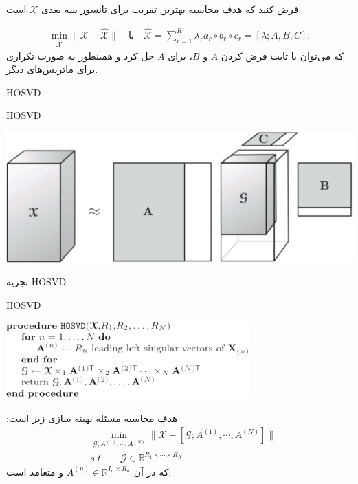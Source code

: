 \begin{frame}
\small{
فرض کنید که هدف محاسبه بهترین تقریب برای تانسور سه بعدی 
$\mathcal{X}$
است. 

\begin{align*}
\min\limits_{\hat{\mathcal{X}}}\|\mathcal{X}-\hat{\mathcal{X}}\|
\quad \text{با}\quad
\hat{\mathcal{X}}=\sum_{r=1}^R \lambda_r a_r\circ b_r\circ c_r=[\lambda;A,B,C].
\end{align*}
که می‌توان با ثابت فرض کردن $A$ و $B$، 
برای $A$ حل کرد و همینطور به صورت تکراری برای ماتریس‌های دیگر.
}
\end{frame}
\begin{frame}[standout]
HOSVD
\end{frame}
\begin{frame}{HOSVD}
\begin{center}
	\includegraphics[width=1\textwidth]{img/ok/HOSVD.pdf}
\end{center}
\begin{center}
	تجزیه
	HOSVD
\end{center}
\end{frame}
\begin{frame}{HOSVD}
\begin{center}
	\includegraphics[width=0.7\textwidth]{img/ok/alHOSVD.pdf}
\end{center}
\pause
\small{
هدف محاسبه مسئله بهینه سازی زیر است:
\begin{align*}
&\min\limits_{\mathcal{G},A^{(1)},\cdots,A^{(N)}} \|\mathcal{X}-[\mathcal{G};A^{(1)},\cdots,A^{(N)}]\|\\
&s.t \qquad \mathcal{G}\in\mathbb{R}^{R_1\times \cdots\times R_N}
\end{align*}
که در آن
$A^{(n)}\in\mathbb{R}^{I_n\times R_n}$
و متعامد است.
}
\end{frame}